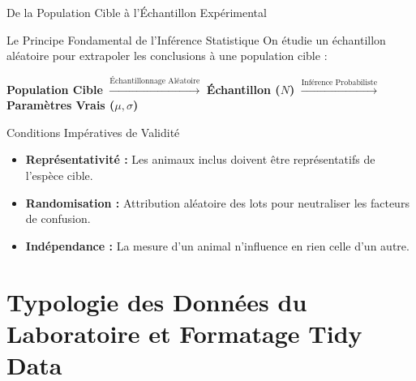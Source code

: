 \documentclass[aspectratio=169,10pt]{beamer}
\begin{document}
\begin{frame}{De la Population Cible à l'Échantillon Expérimental}
  \begin{conceptbox}{Le Principe Fondamental de l'Inférence Statistique}
    On étudie un échantillon aléatoire pour extrapoler les conclusions à une population cible :
    \begin{center}
      \textbf{\color{BioNavy}Population Cible} $\xrightarrow{\text{Échantillonnage Aléatoire}}$ \textbf{\color{BioTeal}Échantillon ($N$)} $\xrightarrow{\text{Inférence Probabiliste}}$ \textbf{\color{BioGreen}Paramètres Vrais ($\mu, \sigma$)}
    \end{center}
  \end{conceptbox}
  \vspace{1.5mm}
  \begin{biobox}{Conditions Impératives de Validité}
    \begin{itemize}\setlength{\itemsep}{1.5pt}
      \item \textbf{Représentativité :} Les animaux inclus doivent être représentatifs de l'espèce cible.
      \item \textbf{Randomisation :} Attribution aléatoire des lots pour neutraliser les facteurs de confusion.
      \item \textbf{Indépendance :} La mesure d'un animal n'influence en rien celle d'un autre.
    \end{itemize}
  \end{biobox}
\end{frame}

\section{Typologie des Données du Laboratoire et Formatage Tidy Data}
\end{document}
